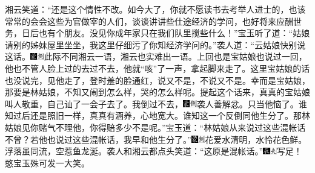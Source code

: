 湘云笑道：``还是这个情性不改。如今大了，你就不愿读书去考举人进士的，也该常常的会会这些为官做宰的人们，谈谈讲讲些仕途经济的学问，也好将来应酬世务，日后也有个朋友。没见你成年家只在我们队里搅些什么！''宝玉听了道：``姑娘请别的姊妹屋里坐坐，我这里仔细污了你知经济学问的。''袭人道：``云姑娘快别说这话。{\includegraphics[width=3mm]{../Images/00006}\includegraphics[width=3mm]{../Images/00011}\footnotesize \kaishu 此际不同湘云一语，湘云也实难出一语。}上回也是宝姑娘也说过一回，他也不管人脸上过的去过不去，他就``咳''了一声，拿起脚来走了。这里宝姑娘的话也没说完，见他走了，登时羞的脸通红，说又不是，不说又不是。幸而是宝姑娘，那要是林姑娘，不知又闹到怎么样，哭的怎么样呢。提起这个话来，真真的宝姑娘叫人敬重，自己讪了一会子去了。我倒过不去，{\includegraphics[width=3mm]{../Images/00006}\includegraphics[width=3mm]{../Images/00011}\footnotesize \kaishu 袭人善解忿。}只当他恼了。谁知过后还是照旧一样，真真有涵养，心地宽大。谁知这一个反倒同他生分了。那林姑娘见你赌气不理他，你得赔多少不是呢。''宝玉道：``林姑娘从来说过这些混帐话不曾？若他也说过这些混帐话，我早和他生分了。''{\includegraphics[width=3mm]{../Images/00006}\includegraphics[width=3mm]{../Images/00011}\footnotesize \kaishu 花爱水清明，水怜花色鲜。浮落虽同流，空惹鱼龙涎。}袭人和湘云都点头笑道：``这原是混帐话。''{\includegraphics[width=3mm]{../Images/00009}\includegraphics[width=3mm]{../Images/00012}\footnotesize \kaishu 写足！憨宝玉殊可发一大笑。}

